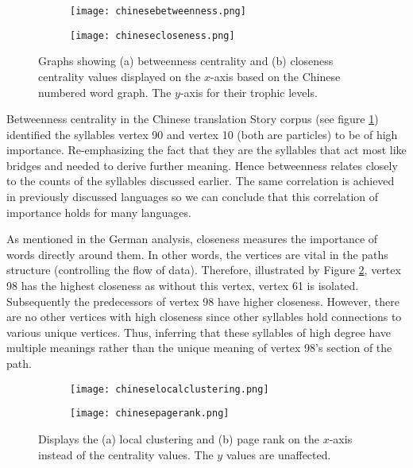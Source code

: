 \begin{figure}[!htb]
\centering
\begin{subfigure}{.45\textwidth}
	\hspace{-1cm} 
	\texttt{[image: chinesebetweenness.png]}
	\caption{}
	\label{fig:cnbc}
\end{subfigure}
\hfill
\begin{subfigure}{.45\textwidth}
	\hspace{-1cm} 
	\texttt{[image: chinesecloseness.png]}
	\caption{ }
	\label{fig:cncc}
\end{subfigure}
\caption{Graphs showing (a) betweenness centrality and (b) closeness centrality values displayed on the $x$-axis based on the Chinese numbered word graph. The $y$-axis for their trophic levels.}
\label{fig:cncentrality}
\end{figure}

Betweenness centrality in the Chinese translation Story corpus (see figure \ref{fig:cnbc}) identified the syllables vertex 90 and vertex 10 (both are particles) to be of high importance. Re-emphasizing the fact that they are the syllables that act most like bridges and needed to derive further meaning. Hence betweenness relates closely to the counts of the syllables discussed earlier. The same correlation is achieved in previously discussed languages so we can conclude that this correlation of importance holds for many languages.

As mentioned in the German analysis, closeness measures the importance of words directly around them. In other words, the vertices are vital in the paths structure (controlling the flow of data). Therefore, illustrated by Figure \ref{fig:cncc}, vertex 98 has the highest closeness as without this vertex, vertex 61 is isolated. Subsequently the predecessors of vertex 98 have higher closeness. However, there are no other vertices with high closeness since other syllables hold connections to various unique vertices. Thus, inferring that these syllables of high degree have multiple meanings rather than the unique meaning of vertex 98's section of the path.

\begin{figure}[!htb]
\centering
\begin{subfigure}{.45\textwidth}
	\hspace{-1cm} 
	\texttt{[image: chineselocalclustering.png]}
	\caption{}
	\label{fig:cnlc}
\end{subfigure}
\hfill
\begin{subfigure}{.45\textwidth}
	\hspace{-1cm} 
	\texttt{[image: chinesepagerank.png]}
	\caption{}
	\label{fig:cnpr}
\end{subfigure}
\caption{Displays the (a) local clustering and (b) page rank on the $x$-axis instead of the centrality values. The $y$ values are unaffected.}
\label{fig:cnother}
\end{figure}

